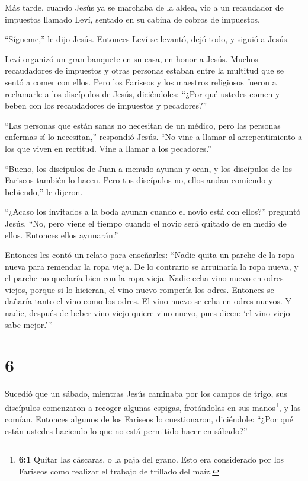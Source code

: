  Más tarde, cuando Jesús ya se marchaba de la aldea, vio a
un recaudador de impuestos llamado Leví, sentado en su cabina de cobros
de impuestos.

``Sígueme,'' le dijo Jesús.  Entonces Leví se levantó, dejó
todo, y siguió a Jesús.

 Leví organizó un gran banquete en su casa, en honor a
Jesús. Muchos recaudadores de impuestos y otras personas estaban entre
la multitud que se sentó a comer con ellos. Pero los Fariseos y los
maestros religiosos fueron a reclamarle a los discípulos de Jesús,
diciéndoles:  ``¿Por qué ustedes comen y beben con los
recaudadores de impuestos y pecadores?''

 ``Las personas que están sanas no necesitan de un médico,
pero las personas enfermas sí lo necesitan,'' respondió Jesús.
 ``No vine a llamar al arrepentimiento a los que viven en
rectitud. Vine a llamar a los pecadores.''

 ``Bueno, los discípulos de Juan a menudo ayunan y oran, y
los discípulos de los Fariseos también lo hacen. Pero tus discípulos no,
ellos andan comiendo y bebiendo,'' le dijeron.

 ``¿Acaso los invitados a la boda ayunan cuando el novio
está con ellos?'' preguntó Jesús.  ``No, pero viene el
tiempo cuando el novio será quitado de en medio de ellos. Entonces ellos
ayunarán.''

 Entonces les contó un relato para enseñarles: ``Nadie
quita un parche de la ropa nueva para remendar la ropa vieja. De lo
contrario se arruinaría la ropa nueva, y el parche no quedaría bien con
la ropa vieja.  Nadie echa vino nuevo en odres viejos,
porque si lo hicieran, el vino nuevo rompería los odres. Entonces se
dañaría tanto el vino como los odres.  El vino nuevo se
echa en odres nuevos.  Y nadie, después de beber vino viejo
quiere vino nuevo, pues dicen: `el vino viejo sabe mejor.'\,''

\hypertarget{section-5}{%
\section{6}\label{section-5}}

 Sucedió que un sábado, mientras Jesús caminaba por los
campos de trigo, sus discípulos comenzaron a recoger algunas espigas,
frotándolas en sus manos\footnote{\textbf{6:1} Quitar las cáscaras, o la
  paja del grano. Esto era considerado por los Fariseos como realizar el
  trabajo de trillado del maíz.}, y las comían.  Entonces
algunos de los Fariseos lo cuestionaron, diciéndole: ``¿Por qué están
ustedes haciendo lo que no está permitido hacer en sábado?''

